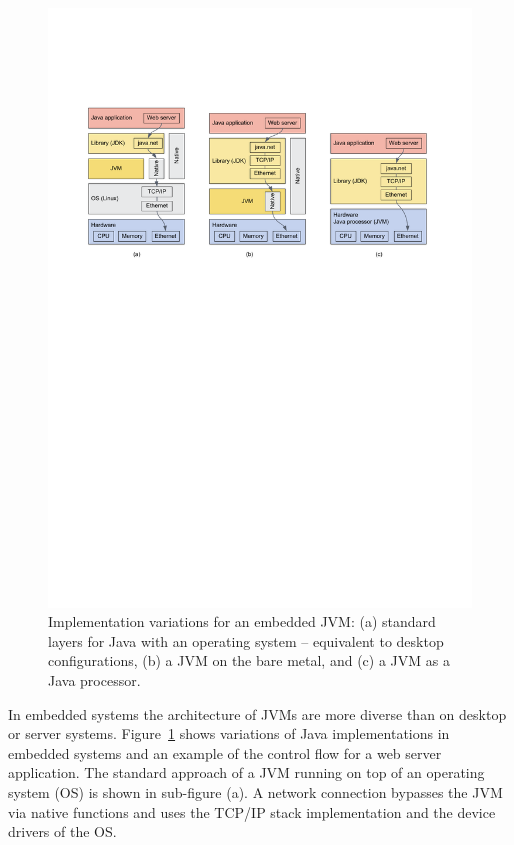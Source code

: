\begin{figure}
    \centering
    \includegraphics[width=\textwidth]{visio/jvmall}
    \caption{Implementation variations for an embedded JVM: (a) standard layers
    for Java with an operating system -- equivalent to desktop configurations, (b) a JVM on the bare metal,
    and (c) a JVM as a Java processor.}\label{fig:java:embedded}
\end{figure}

In embedded systems the architecture of JVMs are more diverse than
on desktop or server systems. Figure~\ref{fig:java:embedded} shows
variations of Java implementations in embedded systems and an
example of the control flow for a web server application. The
standard approach of a JVM running on top of an operating system
(OS) is shown in sub-figure (a). A network connection bypasses the
JVM via native functions and uses the TCP/IP stack implementation
and the device drivers of the OS.

